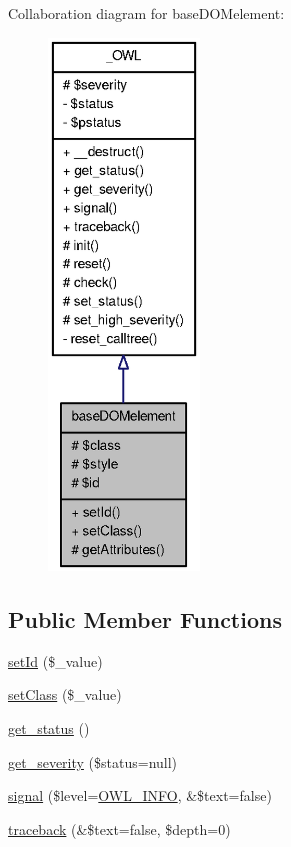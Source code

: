 Collaboration diagram for baseDOMelement:\nopagebreak
\begin{figure}[H]
\begin{center}
\leavevmode
\includegraphics[height=400pt]{classbaseDOMelement__coll__graph}
\end{center}
\end{figure}
\subsection*{Public Member Functions}
\begin{DoxyCompactItemize}
\item 
\hyperlink{classbaseDOMelement_ad678d9e47e7164c759270b5a1631a61c}{setId} (\$\_\-value)
\item 
\hyperlink{classbaseDOMelement_a18849fdddb0e33281d59cf069eb9df74}{setClass} (\$\_\-value)
\item 
\hyperlink{class__OWL_a99ec771fa2c5c279f80152cc09e489a8}{get\_\-status} ()
\item 
\hyperlink{class__OWL_adf9509ef96858be7bdd9414c5ef129aa}{get\_\-severity} (\$status=null)
\item 
\hyperlink{class__OWL_a51ba4a16409acf2a2f61f286939091a5}{signal} (\$level=\hyperlink{owl_8severitycodes_8php_a139328861128689f2f4def6a399d9057}{OWL\_\-INFO}, \&\$text=false)
\item 
\hyperlink{class__OWL_aa29547995d6741b7d2b90c1d4ea99a13}{traceback} (\&\$text=false, \$depth=0)
\end{DoxyCompactItemize}
